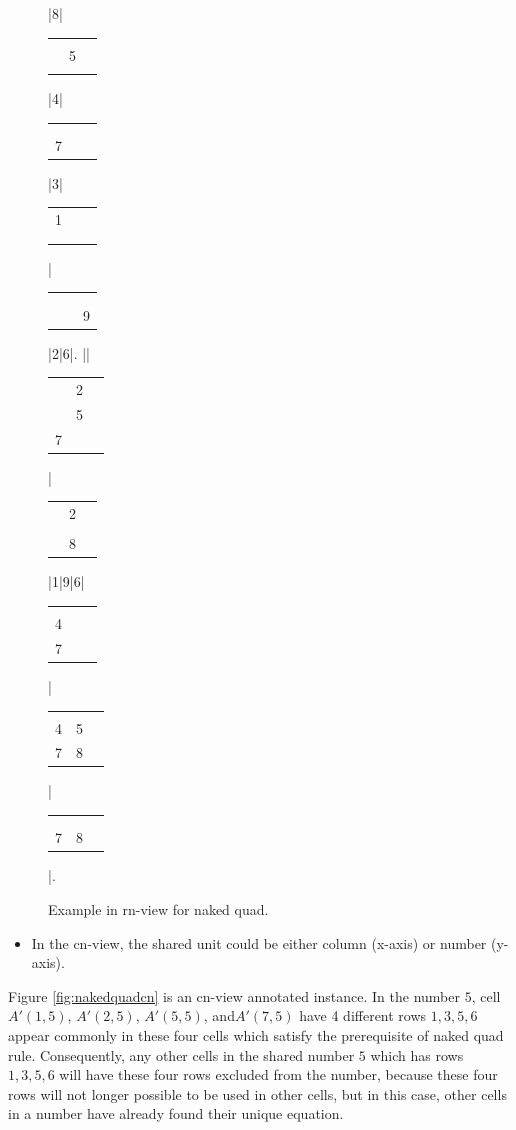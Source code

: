 \documentclass[11pt]{report}
\newcommand{\cell}[9]{%
\scriptsize
\setlength{\tabcolsep}{1pt}
\renewcommand{\arraystretch}{0.5}
\hspace{-0.6em}
\begin{tabular}{ccc}
#1 & #2 & #3\\
#4 & #5 & #6\\
#7 & #8 & #9
\end{tabular}
}
\begin{document}
\begin{figure}[htbp]
\begin{sudoku}
|{8}|{\cell {}{}{}{}5{}{}{}{}}|4| {\cell {}{}{}{}{}{}7{}{}}|3| {\cell 1{}{}{}{}{}{}{}{}}|{\cell {}{}{}{}{}{}{}{}9}|2|6|.
|{\makebox[0pt]{\hspace{-2.3em}\large r9}{\cell {}{}3{}{}{}{}{}{}}}| {\cell {}2{}{}5{}7{}{}}|{\cell {}2{}{}{}{}{}8{}}|1|9|6|{\cell {}{}{}4{}{}7{}{}}| {\cell {}{}{}45{}78{}}|{\cell {}{}{}{}{}{}78{}}|.
\end{sudoku}
\caption{Example in rn-view for naked quad.}
\label{fig:nakedquadrn}
\end{figure}

\begin{itemize}
\item In the cn-view, the shared unit could be either column (x-axis) or number (y-axis).
\end{itemize}

Figure \ref{fig:nakedquadcn} is an cn-view annotated instance. In the number $5$, cell $A'(1,5)$, $A'(2,5)$, $A'(5,5)$, and$A'(7,5)$ have 4 different rows $1, 3, 5, 6$ appear commonly in these four cells which satisfy the prerequisite of naked quad rule. Consequently, any other cells in the shared number $5$ which has rows $1, 3, 5, 6$ will have these four rows excluded from the number, because these four rows will not longer possible to be used in other cells, but in this case, other cells in a number have already found their unique equation.\\
\end{document}
